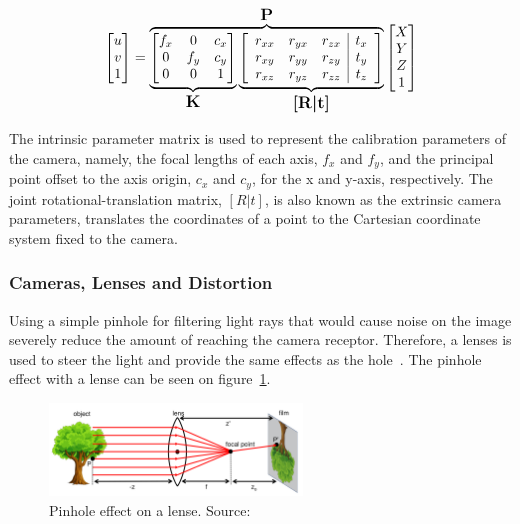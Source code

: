 \begin{equation}
	\label{eq:camera_transform_full}
	\begin{bmatrix}
		u \\
		v \\
		1
	\end{bmatrix}
	= 
	\overbrace{
		\underbrace{
			\begin{bmatrix}
				f_x & 0 & c_x \\
				0 & f_y & c_y \\
				0 & 0 & 1 
			\end{bmatrix}
		}_\text{\large\textbf{K}}
		\underbrace{
			\left[
				\begin{array}{ccc|c}
					r_{xx} & r_{yx} & r_{zx} & t_x \\
					r_{xy} & r_{yy} & r_{zy} & t_y \\
					r_{xz} & r_{yz} & r_{zz} & t_z 
				\end{array}
		\right]
		}_\text{\large\textbf{[R|t]}}
	}^\text{\large\textbf{P}}
	\begin{bmatrix}
		X \\
		Y \\
		Z \\
		1
	\end{bmatrix}
\end{equation}

The intrinsic parameter matrix is used to represent the calibration parameters of the camera, namely, the focal lengths of each axis, $f_x$ and $f_y$, and the principal point offset to the axis origin, $c_x$ and $c_y$, for the x and y-axis, respectively. The joint rotational-translation matrix, $[R|t]$, is also known as the extrinsic camera parameters, translates the coordinates of a point to the Cartesian coordinate system fixed to the camera.


\subsubsection{Cameras, Lenses and Distortion}
Using a simple pinhole for filtering light rays that would cause noise on the image severely reduce the amount of reaching the camera receptor. Therefore, a lenses is used to steer the light and provide the same effects as the hole~\cite{Sturm2010}. The pinhole effect with a lense can be seen on figure~\ref{fig:pinhole_with_lense}.

\begin{figure}[H]
	\centering
	\includegraphics[width=0.6\textwidth]{img/camera/pinhole_with_lense.png}
	\caption{Pinhole effect on a lense. Source:~\cite{camera_models}}
	\label{fig:pinhole_with_lense}
\end{figure}

